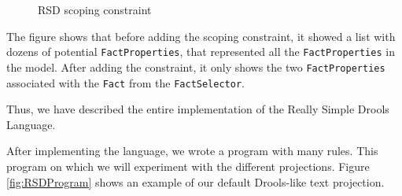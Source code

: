 \begin{figure}
    \centering
    \caption{RSD scoping constraint}
    \label{fig:RSDConstraint}
\end{figure}

The figure shows that before adding the scoping constraint, it showed a list with dozens of potential \texttt{FactProperties}, that represented all the \texttt{FactProperties} in the model.
After adding the constraint, it only shows the two \texttt{FactProperties} associated with the \texttt{Fact} from the \texttt{FactSelector}.

Thus, we have described the entire implementation of the Really Simple Drools Language.

After implementing the language, we wrote a program with many rules.
This program on which we will experiment with the different projections.
Figure \ref{fig:RSDProgram} shows an example of our default Drools-like text projection.


